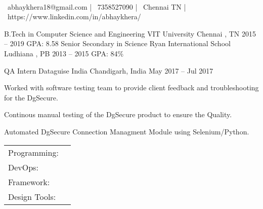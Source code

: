 \documentclass[]{awesome-cv}
\begin{document}
\begin{center}
	  \\
	\vspace{2mm}
	{\faEnvelope\ abhaykhera18@gmail.com} | {\faMobile\ 7358527090} | {\faMapMarker\ Chennai TN} | {\faLink\ https://www.linkedin.com/in/abhaykhera/}
\end{center}
\begin{cventries}
	\cventry
	{B.Tech in Computer Science and Engineering}
	{VIT University}
	{Chennai , TN}
	{2015 – 2019}
	{GPA: 8.58}
	\cventry
	{Senior Secondary in Science}
	{Ryan International School}
	{Ludhiana , PB}
	{2013 – 2015}
	{GPA: 84\%}
\end{cventries}

\vspace{-2mm}
\begin{cventries}
	\cventry
	{QA Intern}
	{Dataguise India}
	{Chandigarh, India}
	{May 2017 – Jul 2017}
	{\begin{cvitems}
		\item {Worked with software testing team to provide client feedback and troubleshooting for the DgSecure.}
		\item {Continous manual testing of the DgSecure product to ensure the Quality.}
		\item {Automated DgSecure Connection Managment Module using Selenium/Python.}
		\end{cvitems}}
\end{cventries}
\begin{cventries}
	\cventry
	{}
	{\def\arraystretch{1.15}{\begin{tabular}{ l l }
		Programming:  & {\skill{ C, C++, Python, HTML/CSS, JavaScript}} \\
		DevOps:  & {\skill{ AWS EC2, OpenStack}} \\
		Framework:  & {\skill{ Bootstrap, Selenium}} \\
		Design Tools:  & {\skill{ Adobe PhotoShop}} \\
		\end{tabular}}}
	{}
	{}
	{}
\end{cventries}
\end{document}
